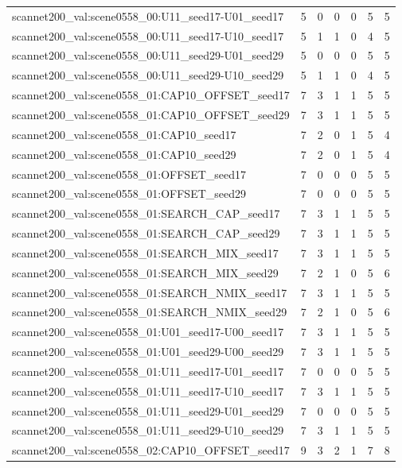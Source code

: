 \begin{table}[t]
\begin{tabular}{lrrrrrr}
scannet200\_val:scene0558\_00:U11\_seed17-U01\_seed17 & 5 & 0 & 0 & 0 & 5 & 5 \\
scannet200\_val:scene0558\_00:U11\_seed17-U10\_seed17 & 5 & 1 & 1 & 0 & 4 & 5 \\
scannet200\_val:scene0558\_00:U11\_seed29-U01\_seed29 & 5 & 0 & 0 & 0 & 5 & 5 \\
scannet200\_val:scene0558\_00:U11\_seed29-U10\_seed29 & 5 & 1 & 1 & 0 & 4 & 5 \\
scannet200\_val:scene0558\_01:CAP10\_OFFSET\_seed17 & 7 & 3 & 1 & 1 & 5 & 5 \\
scannet200\_val:scene0558\_01:CAP10\_OFFSET\_seed29 & 7 & 3 & 1 & 1 & 5 & 5 \\
scannet200\_val:scene0558\_01:CAP10\_seed17 & 7 & 2 & 0 & 1 & 5 & 4 \\
scannet200\_val:scene0558\_01:CAP10\_seed29 & 7 & 2 & 0 & 1 & 5 & 4 \\
scannet200\_val:scene0558\_01:OFFSET\_seed17 & 7 & 0 & 0 & 0 & 5 & 5 \\
scannet200\_val:scene0558\_01:OFFSET\_seed29 & 7 & 0 & 0 & 0 & 5 & 5 \\
scannet200\_val:scene0558\_01:SEARCH\_CAP\_seed17 & 7 & 3 & 1 & 1 & 5 & 5 \\
scannet200\_val:scene0558\_01:SEARCH\_CAP\_seed29 & 7 & 3 & 1 & 1 & 5 & 5 \\
scannet200\_val:scene0558\_01:SEARCH\_MIX\_seed17 & 7 & 3 & 1 & 1 & 5 & 5 \\
scannet200\_val:scene0558\_01:SEARCH\_MIX\_seed29 & 7 & 2 & 1 & 0 & 5 & 6 \\
scannet200\_val:scene0558\_01:SEARCH\_NMIX\_seed17 & 7 & 3 & 1 & 1 & 5 & 5 \\
scannet200\_val:scene0558\_01:SEARCH\_NMIX\_seed29 & 7 & 2 & 1 & 0 & 5 & 6 \\
scannet200\_val:scene0558\_01:U01\_seed17-U00\_seed17 & 7 & 3 & 1 & 1 & 5 & 5 \\
scannet200\_val:scene0558\_01:U01\_seed29-U00\_seed29 & 7 & 3 & 1 & 1 & 5 & 5 \\
scannet200\_val:scene0558\_01:U11\_seed17-U01\_seed17 & 7 & 0 & 0 & 0 & 5 & 5 \\
scannet200\_val:scene0558\_01:U11\_seed17-U10\_seed17 & 7 & 3 & 1 & 1 & 5 & 5 \\
scannet200\_val:scene0558\_01:U11\_seed29-U01\_seed29 & 7 & 0 & 0 & 0 & 5 & 5 \\
scannet200\_val:scene0558\_01:U11\_seed29-U10\_seed29 & 7 & 3 & 1 & 1 & 5 & 5 \\
scannet200\_val:scene0558\_02:CAP10\_OFFSET\_seed17 & 9 & 3 & 2 & 1 & 7 & 8 \\

\end{tabular}
\end{table}
